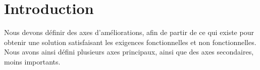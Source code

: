 \section*{Introduction}

Nous devons définir des axes d'améliorations, afin de partir de ce
qui existe pour obtenir une solution satisfaisant les exigences
fonctionnelles et non fonctionnelles. 
Nous avons ainsi défini plusieurs axes principaux, ainsi que des
axes secondaires, moins importants.

